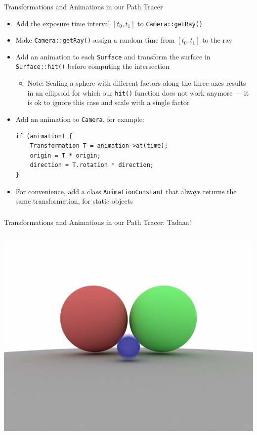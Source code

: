 \documentclass[utf8,stillsansserifmath,fleqn,t]{beamer}
\newcommand{\code}[1]{\texttt{#1}}
\begin{document}
\begin{frame}[fragile,label=transf-and-anim-2]
\frametitle{\insertsection}
Transformations and Animations in our Path Tracer
\begin{itemize}
\item Add the exposure time interval $[t_0,t_1]$ to \code{Camera::getRay()}
\item Make \code{Camera::getRay()} assign a random time from $[t_0,t_1]$ to the
ray
\item Add an animation to each \code{Surface} and transform the surface in
\code{Surface::hit()} before computing the intersection
\begin{itemize}
\item Note: Scaling a sphere with different factors along the three axes
results in an ellipsoid for which our \code{hit()} function does not work
anymore --- it is ok to ignore this case and scale with a single factor
\end{itemize}
\item Add an animation to \code{Camera}, for example:
\begin{lstlisting}
if (animation) {
    Transformation T = animation->at(time);
    origin = T * origin;
    direction = T.rotation * direction;
}
\end{lstlisting}
\item For convenience, add a class \texttt{AnimationConstant} that always
returns the same transformation, for static objects
\end{itemize}
\end{frame}

\begin{frame}[label=transf-and-anim-3]
\frametitle{\insertsection}
Transformations and Animations in our Path Tracer: Tadaaa!\\~\\
\centerline{\includegraphics[width=.7\textwidth]{./fig/pathtracer-result-02.png}}
\end{frame}
\end{document}
